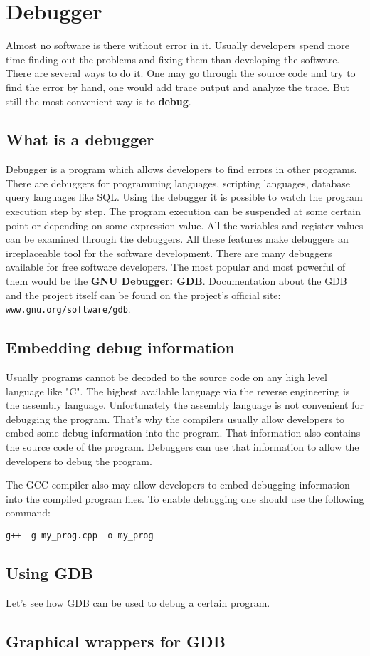 
\section{Debugger}
\label{debugger}
Almost no software is there without error in it. Usually developers spend more time finding out the problems and fixing them than developing the software. There are several ways to do it. One may go through the source code and try to find the error by hand, one would add trace output and analyze the trace. But still the most convenient way is to {\bf debug}.

\subsection{What is a debugger}
Debugger is a program which allows developers to find errors in other programs. There are debuggers for programming languages, scripting languages, database query languages like SQL. Using the debugger it is possible to watch the program execution step by step. The program execution can be suspended at some certain point or depending on some expression value. All the variables and register values can be examined through the debuggers. All these features make debuggers an irreplaceable tool for the software development. There are many debuggers available for free software developers. The most popular and most powerful of them would be the {\bf GNU Debugger: GDB}. Documentation about the GDB and the project itself can be found on the project's official site: {\tt www.gnu.org/software/gdb}.

\subsection{Embedding debug information}
Usually programs cannot be decoded to the source code on any high level language like "C". The highest available language via the reverse engineering is the assembly language. Unfortunately the assembly language is not convenient for debugging the program. That's why the compilers usually allow developers to embed some debug information into the program. That information also contains the source code of the program. Debuggers can use that information to allow the developers to debug the program. 

The GCC compiler also may allow developers to embed debugging information into the compiled program files. To enable debugging one should use the following command:

{\tt g++ -g my\_prog.cpp -o my\_prog}

\subsection{Using GDB}
Let's see how GDB can be used to debug a certain program. 

\subsection{Graphical wrappers for GDB}
